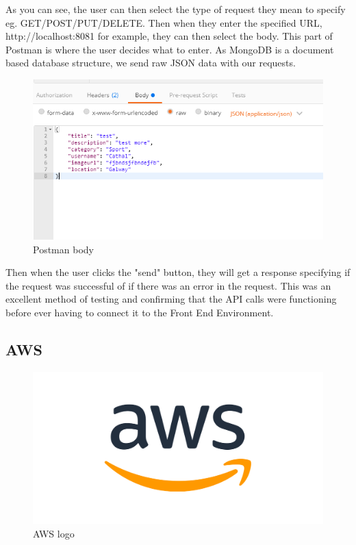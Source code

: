 \par As you can see, the user can then select the type of request they mean to specify eg. GET/POST/PUT/DELETE. Then when they enter the specified URL, http://localhost:8081 for example, they can then select the body. This part of Postman is where the user decides what to enter. As MongoDB is a document based database structure, we send raw JSON data with our requests. \par

\begin{figure}[bh]
\renewcommand\thefigure{3.12}
\centering
\includegraphics[scale = 0.8]{img/postman-JSON.PNG}
\caption{Postman body}
\label{PostmanBody}
\end{figure}

Then when the user clicks the "send" button, they will get a response specifying if the request was successful of if there was an error in the request. This was an excellent method of testing and confirming that the API calls were functioning before ever having to connect it to the Front End Environment.

\subsection{AWS}

\begin{figure}[h]
\renewcommand\thefigure{3.13}
\centering
\includegraphics[scale = 0.3]{img/aws_logo_smile_1200x630.png}
\caption{AWS logo}
\label{AWSLogo}
\end{figure}

